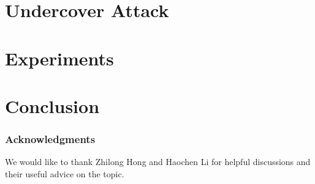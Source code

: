 \documentclass{article}
\begin{document}
\section{Undercover Attack}

\section{Experiments}


\section{Conclusion}














\subsubsection*{Acknowledgments}

We would like to thank Zhilong Hong and Haochen Li for helpful discussions and their useful advice on the topic. %

\small


\end{document}
